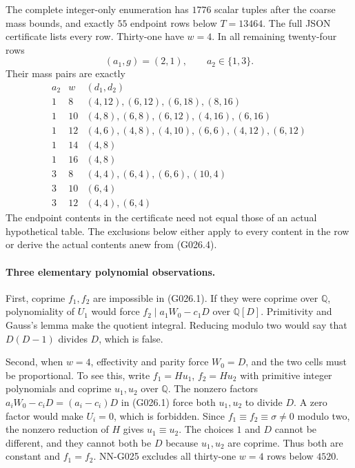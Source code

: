 The complete integer-only enumeration
has $1776$ scalar tuples after the coarse mass bounds,
and exactly $55$ endpoint rows below $T=13464$.
The full JSON certificate lists every row. Thirty-one
have $w=4$. In all remaining twenty-four rows
\[
 (a_1,g)=(2,1),\qquad a_2\in\{1,3\}.
\]
Their mass pairs are exactly
\[
\begin{array}{c|c|l}
 a_2&w&(d_1,d_2)\\\hline
 1&8&(4,12),(6,12),(6,18),(8,16)\\
 1&10&(4,8),(6,8),(6,12),(4,16),(6,16)\\
 1&12&(4,6),(4,8),(4,10),(6,6),(4,12),(6,12)\\
 1&14&(4,8)\\
 1&16&(4,8)\\
 3&8&(4,4),(6,4),(6,6),(10,4)\\
 3&10&(6,4)\\
 3&12&(4,4),(6,4)
\end{array}                                                         \tag{G026.6}
\]
The endpoint contents in the certificate need not equal
those of an actual hypothetical table. The exclusions
below either apply to every content in the row or derive
the actual contents anew from (G026.4).

\paragraph{Three elementary polynomial observations.}
First, coprime $f_1,f_2$ are impossible in (G026.1).
If they were coprime over $\mathbb Q$, polynomiality of
$U_1$ would force $f_2\mid a_1W_0-c_1D$ over $\mathbb Q[D]$.
Primitivity and Gauss's lemma make the quotient integral.
Reducing modulo two would say that $D(D-1)$ divides $D$,
which is false.

Second, when $w=4$, effectivity and parity force $W_0=D$,
and the two cells must be proportional. To see this,
write $f_1=Hu_1$, $f_2=Hu_2$ with primitive integer
polynomials and coprime $u_1,u_2$ over $\mathbb Q$.
The nonzero factors $a_iW_0-c_iD=(a_i-c_i)D$ in
(G026.1) force both $u_1,u_2$ to divide $D$.
A zero factor would make $U_i=0$, which is forbidden.
Since $f_1\equiv f_2\equiv\sigma\ne0$ modulo two,
the nonzero reduction of $H$ gives $u_1\equiv u_2$.
The choices $1$ and $D$ cannot be different, and they
cannot both be $D$ because $u_1,u_2$ are coprime.
Thus both are constant and $f_1=f_2$. NN-G025 excludes
all thirty-one $w=4$ rows below $4520$.

